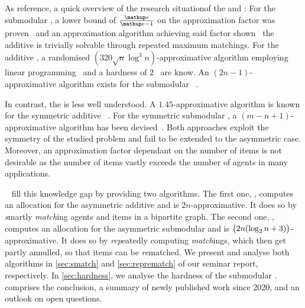 As reference, a quick overview of the research situation\footnotemark[1] of the \USW{} and \ESW{}:
For the submodular \USW{}, a lower bound of \(\frac{\euler}{\euler - 1}\) on the approximation factor was proven~\cite{inapprox_results_for_combi_auctions_with_submod_utility_funcs} and an approximation algorithm achieving said factor shown~\cite{opt_approx_for_the_submod_nsw_in_the_value_oracle_model} \emdash{} the additive \USW{} is trivially solvable through repeated maximum matchings.
For the additive \ESW, a randomised \((320 \sqrt{n} \log^3 n)\)-approximative algorithm employing linear programming~\cite{an_approx_algo_for_maxmin_fair_alloc_of_indiv_goods} and a hardness of \(2\)~\cite{allocating_indiv_goods} are know.
An \((2n-1)\)-approximative algorithm exists for the submodular \ESW~\cite{approx_algo_for_the_maxmin_alloc_problem}.

In contrast, the \NSW{} is less well understood\footnotemark[1].
A \(1.45\)-approximative algorithm is known for the symmetric additive \NSW~\cite{finding_fair_and_efficient_allocs}.
For the symmetric submodular \NSW, a \((m - n + 1)\)-approximative algorithm has been devised~\cite{min_envy_and_max_avg_nsw_in_the_alloc_of_indiv_goods}.
Both approaches exploit the symmetry of the studied problem and fail to be extended to the asymmetric case.
Moreover, an approximation factor dependant on the number of items is not desirable as the number of items vastly exceeds the number of agents in many applications.

~\cite{APNSWuSVþUM} fill this knowledge gap by providing two algorithms.
The first one, \emph{\SMatch}, computes an allocation for the asymmetric additive \NSW{} and is \(2n\)-approximative.
It does so by \emph{s}martly \emph{match}ing agents and items in a bipartite graph.
The second one, \emph{\RepReMatch}, computes an allocation for the asymmetric submodular \NSW{} and is \(\paren[\big]{2n (\log_2 n + 3)}\)-approximative.
It does so by \emph{rep}eatedly computing \emph{match}ings, which then get partly annulled, so that items can be \emph{re}matched.
We present and analyse both algorithms in \cref{sec:smatch} and \cref{sec:reprematch} of our seminar report, respectively.
In \cref{sec:hardness}, we analyse the hardness of the submodular \NSW.
 comprises the conclusion, a summary of newly published work since 2020, and an outlook on open questions.



